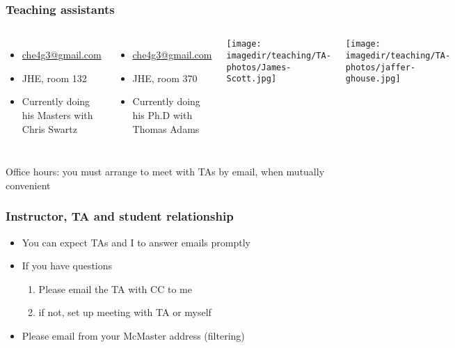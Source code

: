 \begin{frame}\frametitle{Teaching assistants}
	\begin{columns}[c]
			{\color{myGreen}{James Scott}}
			\begin{itemize}
				\item	\url{che4g3@gmail.com}
				\item	JHE, room 132
				\item	Currently doing his Masters with Chris Swartz
			\end{itemize}
			
			\vspace{0.8cm}
			{\color{myGreen}{Jaffer Ghouse}}
			\begin{itemize}
				\item	\url{che4g3@gmail.com}
				\item	JHE, room 370
				\item	Currently doing his Ph.D with Thomas Adams
			\end{itemize}
			
			\centerline{\texttt{[image: \\imagedir/teaching/TA-photos/James-Scott.jpg]}}
			
			\vspace{0.5cm}
			\centerline{\texttt{[image: \\imagedir/teaching/TA-photos/jaffer-ghouse.jpg]}}

	\end{columns}
	
	\vspace{0.3cm}
	{\color{myOrange}\scriptsize{Office hours: you must arrange to meet with TAs by email, when mutually convenient}}
\end{frame}

\begin{frame}\frametitle{Instructor, TA and student relationship}
	\begin{itemize}
		\item	You can expect TAs and I to answer emails promptly

		\vspace{12pt}
		\item	If you have questions
			\begin{enumerate}
				\item	Please email the TA with CC to me \hfill {\tiny{\color{myOrange}{$\longleftarrow$ hopefully this solves your problem}}}
				\item	if not, set up meeting with TA or myself
			\end{enumerate}
		\item	Please email from your McMaster address (filtering)
	\end{itemize}
\end{frame}


